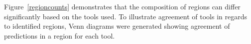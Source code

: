 Figure~\ref{regioncounts} demonstrates that the composition of regions
can differ significantly based on the tools used. To illustrate
agreement of tools in regards to identified regions, Venn diagrams
were generated showing agreement of predictions in a region for each tool.

\begin{figure}
  \centering
  
\end{figure}

